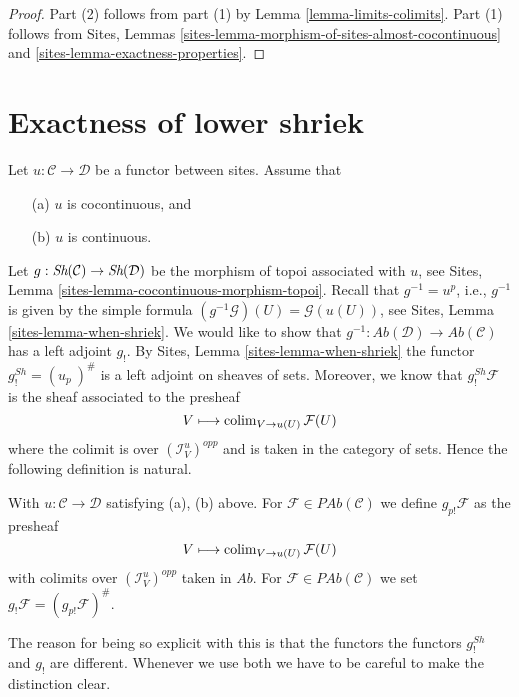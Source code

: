 \begin{proof}
Part (2) follows from part (1) by
Lemma \ref{lemma-limits-colimits}.
Part (1) follows from
Sites, Lemmas
\ref{sites-lemma-morphism-of-sites-almost-cocontinuous} and
\ref{sites-lemma-exactness-properties}.
\end{proof}





\section{Exactness of lower shriek}
\label{section-exactness-lower-shriek}

\noindent
Let $u : \mathcal{C} \to \mathcal{D}$ be a functor between sites.
Assume that
\begin{enumerate}
\item[(a)] $u$ is cocontinuous, and
\item[(b)] $u$ is continuous.
\end{enumerate}
Let $g : \mathop{\textit{Sh}}\nolimits(\mathcal{C}) \to \mathop{\textit{Sh}}\nolimits(\mathcal{D})$ be the
morphism of topoi associated with $u$, see
Sites, Lemma \ref{sites-lemma-cocontinuous-morphism-topoi}.
Recall that $g^{-1} = u^p$, i.e., $g^{-1}$ is given by the simple formula
$(g^{-1}\mathcal{G})(U) = \mathcal{G}(u(U))$, see
Sites, Lemma \ref{sites-lemma-when-shriek}.
We would like to show that
$g^{-1} : \textit{Ab}(\mathcal{D}) \to \textit{Ab}(\mathcal{C})$
has a left adjoint $g_!$. By
Sites, Lemma \ref{sites-lemma-when-shriek}
the functor $g^{Sh}_! = (u_p\ )^\#$ is a left adjoint on sheaves of sets.
Moreover, we know that $g^{Sh}_!\mathcal{F}$ is the sheaf
associated to the presheaf
$$
V \longmapsto \mathop{\rm colim}\nolimits_{V \to u(U)} \mathcal{F}(U)
$$
where the colimit is over $(\mathcal{I}_V^u)^{opp}$ and is taken in the
category of sets. Hence the following definition is natural.

\begin{definition}
\label{definition-g-shriek}
With $u : \mathcal{C} \to \mathcal{D}$ satisfying (a), (b) above.
For $\mathcal{F} \in \textit{PAb}(\mathcal{C})$ we define
{\it $g_{p!}\mathcal{F}$} as the presheaf
$$
V \longmapsto \mathop{\rm colim}\nolimits_{V \to u(U)} \mathcal{F}(U)
$$
with colimits over $(\mathcal{I}_V^u)^{opp}$ taken in $\textit{Ab}$. For
$\mathcal{F} \in \textit{PAb}(\mathcal{C})$ we set
{\it $g_!\mathcal{F} = (g_{p!}\mathcal{F})^\#$}.
\end{definition}

\noindent
The reason for being so explicit with this is that the functors
the functors $g^{Sh}_!$ and $g_!$ are different. Whenever we use both
we have to be careful to make the distinction clear.

